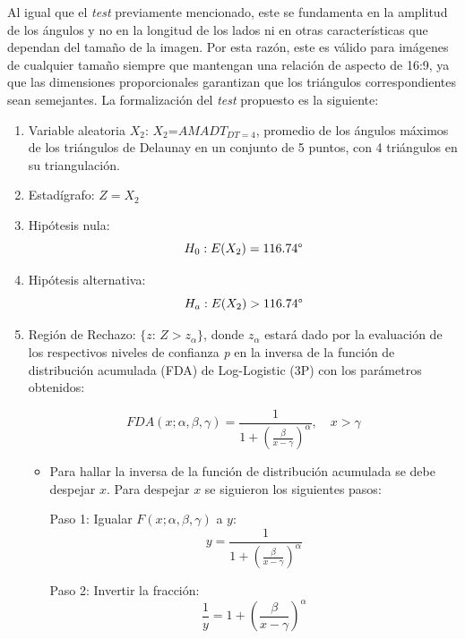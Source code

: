 \documentclass[12pt]{report}
\begin{document}
Al igual que el \textit{test} previamente mencionado, este se fundamenta en la amplitud de los ángulos y no en la longitud de los lados ni en otras características que dependan del tamaño de la imagen. Por esta razón, este es válido para imágenes de cualquier tamaño siempre que mantengan una relación de aspecto de 16:9, ya que las dimensiones proporcionales garantizan que los triángulos correspondientes sean semejantes. La formalización del \textit{test} propuesto es la siguiente:
\begin{enumerate}
	\item Variable aleatoria $X_2$: $X_2$=$AMADT_{DT=4}$, promedio de los ángulos máximos de los triángulos de Delaunay en un conjunto de 5 puntos, con 4 triángulos en su triangulación.
	\item Estadígrafo: $Z=X_2$
	
	\item Hipótesis nula: \[H_0:E(X_2)=116.74\degree\]
	
	
	\item Hipótesis alternativa: \[H_a:E(X_2)>116.74\degree\]
	
	\item  Región de Rechazo: $\{z$: \;$Z>z_\alpha\}$, donde  $z_\alpha$ estará dado por la evaluación de los respectivos niveles de confianza \textit{p} en la  inversa de la función de distribución acumulada (FDA) de Log-Logistic (3P) con los parámetros obtenidos: 
	
	\[
	FDA(x; \alpha, \beta, \gamma) = \frac{1}{1 + \left( \frac{\beta}{x - \gamma} \right)^\alpha}, \quad x > \gamma
	\]
	\begin{itemize}
		\item  Para hallar la inversa de la función de distribución acumulada se debe despejar $x$. Para despejar \( x \)  se siguieron los siguientes pasos:
		
		Paso 1: Igualar \( F(x; \alpha, \beta, \gamma) \) a \( y \):
		\[
		y = \frac{1}{1 + \left( \frac{\beta}{x - \gamma} \right)^\alpha}
		\]
		
		Paso 2: Invertir la fracción:
		\[
		\frac{1}{y} = 1 + \left( \frac{\beta}{x - \gamma} \right)^\alpha
		\]
		

\end{itemize}
\end{enumerate}
\end{document}
